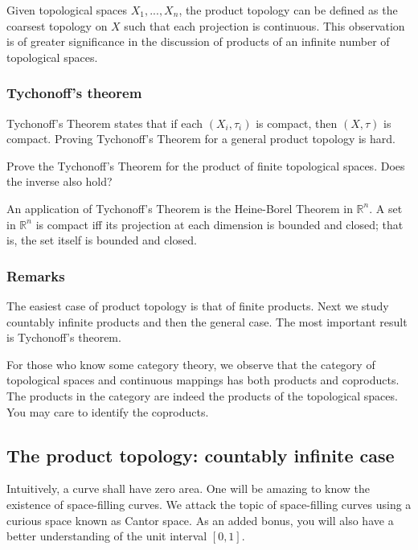 Given topological spaces $X_1, ..., X_n$, 
the product topology can be defined as the
coarsest topology on $X$ such that each projection is continuous.
This observation is of greater significance in the
discussion of products of an infinite number of topological spaces.

\subsubsection{Tychonoff's theorem}

Tychonoff’s Theorem states that if each $(X_i,\tau_i)$ is compact, then $(X, \tau)$ is compact.
Proving Tychonoff’s Theorem for a general product topology is hard.



\begin{qst}
  Prove the Tychonoff’s Theorem for the product of finite topological spaces. Does the inverse also hold?
\end{qst}

An application of Tychonoff’s Theorem is the 
Heine-Borel Theorem in $\mathbb R^n$. 
A set in $\mathbb R^n$ is compact iff
its projection at each dimension is bounded and closed; that is, the set itself is
bounded and closed.  


\subsubsection{Remarks}

The easiest case of product topology is that of finite products. 
Next we study countably infinite products and then the general case.
The most important result is Tychonoff's theorem.

For those who know some category theory, we observe that the category of
topological spaces and continuous mappings has both products and coproducts.
The products in the category are indeed the products of the topological spaces.
You may care to identify the coproducts.




\subsection{The product topology: countably infinite case}

Intuitively, a curve shall have zero area.
One will be amazing to know the existence of space-filling curves.
We attack the topic of space-filling curves using a
curious space known as Cantor space. 
As an added bonus, you will also have a better understanding of the unit interval $[0,1]$.

